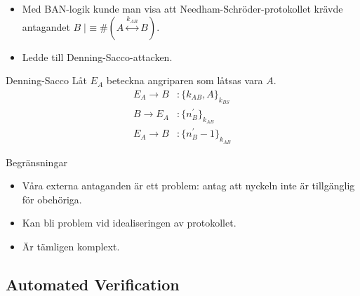 \documentclass{beamer}
\theoremstyle{definition}
\theoremstyle{remark}
\DeclareMathOperator{\believes}{|\!\!\!\equiv}
\newcommand{\fresh}[1]{\#(#1)}
\newcommand{\encrypt}[2]{\{#1\}_{#2}}
\newcommand{\share}[1]{\stackrel{#1}{\leftrightarrow}}
\begin{document}
\begin{frame}
  \begin{itemize}
    \item Med BAN-logik kunde man visa att Needham-Schröder-protokollet krävde 
      antagandet \(B\believes \fresh{A\share{k_{AB}} B}\).
    \item Ledde till Denning-Sacco-attacken.
  \end{itemize}
  \begin{block}{Denning-Sacco}
    Låt \(E_A\) beteckna angriparen som låtsas vara \(A\).
    \begin{align*}
      E_A\to B &\colon \encrypt{k_{AB}, A}{k_{BS}} \\
      B\to E_A &\colon \encrypt{n_B^\prime}{k_{AB}} \\
      E_A\to B &\colon \encrypt{n_B^\prime-1}{k_{AB}}
    \end{align*}
  \end{block}
\end{frame}

\begin{frame}
  \begin{alertblock}{Begränsningar}
    \begin{itemize}
      \item Våra externa antaganden är ett problem: antag att nyckeln inte är 
        tillgänglig för obehöriga.

      \item Kan bli problem vid idealiseringen av protokollet.

      \item Är tämligen komplext.

    \end{itemize}
  \end{alertblock}
\end{frame}

\subsection{Automated Verification}
\end{document}
